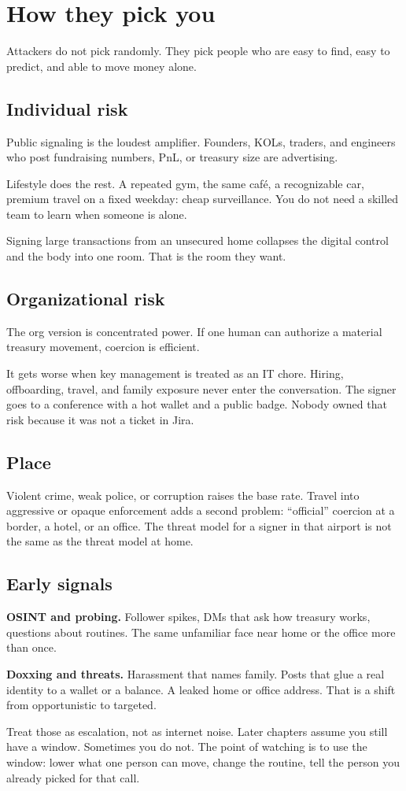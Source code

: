 \chapter{How they pick you}

Attackers do not pick randomly. They pick people who are
easy to find, easy to predict, and able to move money
alone.

\section{Individual risk}

Public signaling is the loudest amplifier. Founders,
KOLs, traders, and engineers who post fundraising
numbers, PnL, or treasury size are advertising.

Lifestyle does the rest. A repeated gym, the same café,
a recognizable car, premium travel on a fixed weekday:
cheap surveillance. You do not need a skilled team to
learn when someone is alone.

Signing large transactions from an unsecured home
collapses the digital control and the body into one room.
That is the room they want.

\section{Organizational risk}

The org version is concentrated power. If one human can
authorize a material treasury movement, coercion is
efficient.

It gets worse when key management is treated as an IT
chore. Hiring, offboarding, travel, and family exposure
never enter the conversation. The signer goes to a
conference with a hot wallet and a public badge. Nobody
owned that risk because it was not a ticket in Jira.

\section{Place}

Violent crime, weak police, or corruption raises the
base rate. Travel into aggressive or opaque enforcement
adds a second problem: ``official'' coercion at a border,
a hotel, or an office. The threat model for a signer in
that airport is not the same as the threat model at home.

\section{Early signals}

\textbf{OSINT and probing.} Follower spikes, DMs that ask
how treasury works, questions about routines. The same
unfamiliar face near home or the office more than once.

\textbf{Doxxing and threats.} Harassment that names
family. Posts that glue a real identity to a wallet or a
balance. A leaked home or office address. That is a
shift from opportunistic to targeted.

Treat those as escalation, not as internet noise. Later
chapters assume you still have a window. Sometimes you
do not. The point of watching is to use the window:
lower what one person can move, change the routine, tell
the person you already picked for that call.
